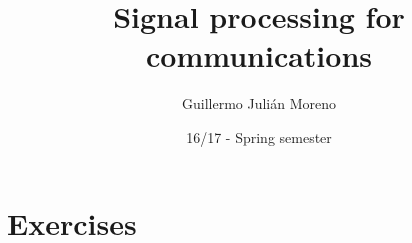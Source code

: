 \documentclass[palatino]{epflnotes}
\title{Signal processing for communications}
\author{Guillermo Julián Moreno}
\date{16/17 - Spring semester}
\begin{document}
\frontmatter
\pagestyle{plain}
\maketitle

\tableofcontents
\mainmatter

\appendix

\chapter{Exercises}

\backmatter
\printindex
\end{document}
